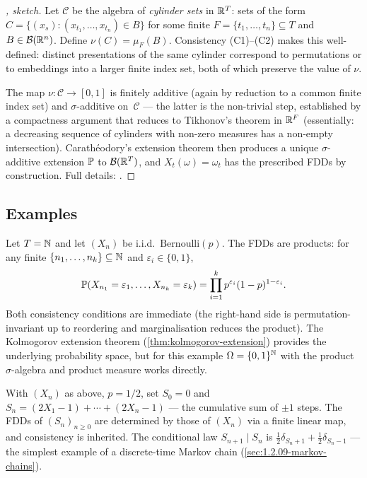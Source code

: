 \begin{proof}[, sketch]
Let $\mathcal{C}$ be the algebra of \emph{cylinder sets} in $\mathbb{R}^T$:
sets of the form
$C = \{(x_s) : (x_{t_1}, \dots, x_{t_n}) \in B\}$ for some finite
$F = \{t_1, \dots, t_n\} \subseteq T$ and $B \in \mathcal{B}(\mathbb{R}^n)$.
Define $\nu(C) = \mu_F(B)$. Consistency (C1)–(C2) makes this
well-defined: distinct presentations of the same cylinder
correspond to permutations or to embeddings into a larger finite
index set, both of which preserve the value of $\nu$.

The map $\nu \colon \mathcal{C} \to [0, 1]$ is finitely additive
(again by reduction to a common finite index set) and
$\sigma$-additive on~$\mathcal{C}$ — the latter is the non-trivial
step, established by a compactness argument that reduces to
Tikhonov's theorem in $\mathbb{R}^F$ (essentially: a decreasing sequence
of cylinders with non-zero measures has a non-empty intersection).
Carathéodory's extension theorem then produces a unique
$\sigma$-additive extension $\mathbb{P}$ to $\mathcal{B}(\mathbb{R}^T)$, and
$X_t(\omega) = \omega_t$ has the prescribed FDDs by construction.
Full details: \cite[Ch.~II, \S~3]{Shiryaev1989}.
\end{proof}

\subsection*{Examples}

\begin{example}
\label{ex:bernoulli-process}
Let $T = \mathbb{N}$ and let $(X_n)$ be i.i.d.\ $\mathrm{Bernoulli}(p)$.
The FDDs are products: for any finite
$\{n_1, \dots, n_k\} \subseteq \mathbb{N}$ and
$\varepsilon_i \in \{0, 1\}$,
\[
  \mathbb{P}(X_{n_1} = \varepsilon_1, \dots, X_{n_k} = \varepsilon_k) = \prod_{i=1}^{k} p^{\varepsilon_i} (1 - p)^{1 - \varepsilon_i}.
\]
Both consistency conditions are immediate (the right-hand side is
permutation-invariant up to reordering and marginalisation reduces
the product). The Kolmogorov extension theorem
(\cref{thm:kolmogorov-extension}) provides the underlying
probability space, but for this example $\Omega = \{0,1\}^{\mathbb{N}}$
with the product $\sigma$-algebra and product measure works
directly.
\end{example}

\begin{example}
\label{ex:simple-rw}
With $(X_n)$ as above, $p = 1/2$, set $S_0 = 0$ and
$S_n = (2 X_1 - 1) + \cdots + (2 X_n - 1)$ — the cumulative sum of
$\pm 1$ steps. The FDDs of $(S_n)_{n \geq 0}$ are determined by
those of $(X_n)$ via a finite linear map, and consistency is
inherited. The conditional law $S_{n+1} \mid S_n$ is
$\frac{1}{2}\delta_{S_n + 1} + \frac{1}{2}\delta_{S_n - 1}$ — the
simplest example of a discrete-time Markov chain
(\cref{sec:1.2.09-markov-chains}).
\end{example}

